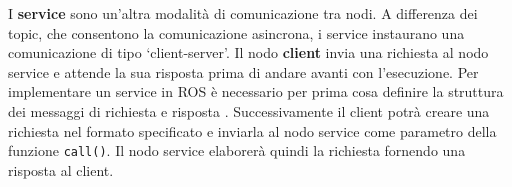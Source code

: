 I \textbf{service} sono un'altra modalit\`{a} di comunicazione tra nodi. A differenza dei topic, che consentono la comunicazione 
asincrona, i service instaurano una comunicazione di tipo `client-server'. Il nodo \textbf{client} invia una richiesta al nodo service e 
attende la sua risposta prima di andare avanti con l'esecuzione. 
Per implementare un service in ROS \`{e} necessario per prima cosa definire la struttura dei messaggi di richiesta e 
risposta \cite{service}. Successivamente il client potr\`{a} creare una richiesta nel formato specificato e inviarla al nodo service  
come parametro della funzione \verb|call()|. 
Il nodo service elaborer\`{a} quindi la richiesta fornendo una risposta al client.